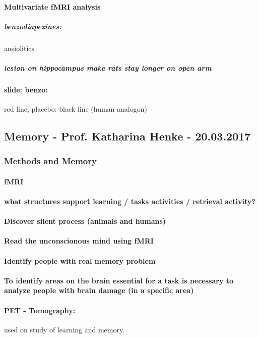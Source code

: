 \documentclass[12pt,article,oneside,a4paper]{memoir}
\begin{document}
\paragraph{Multivariate fMRI analysis}
\subparagraph{benzodiapezines:} ansiolitics
\subparagraph{lesion on hippocampus make rats stay longer on open arm}
\paragraph{slide: benzo:} red line; placebo: black line (human analogon)

\subsection{Memory - Prof. Katharina Henke - 20.03.2017}
\subsubsection{Methods and Memory}
\paragraph{fMRI}
\paragraph{what structures support learning / tasks activities / retrieval activity?}
\paragraph{Discover silent process (animals and humans)}
\paragraph{Read the unconscionous mind using fMRI}
\paragraph{Identify people with real memory problem}

\paragraph{To identify areas on the brain essential for a task is necessary to analyze people with brain damage (in a specific area)}

\paragraph{PET - Tomography:} used on study of learning and memory.
\end{document}
